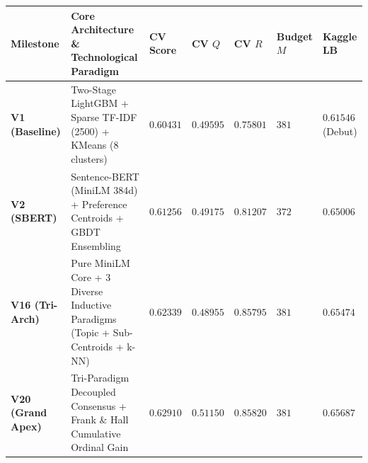 \begin{table}[!htbp]

  \centering

  \footnotesize

  \setlength{\tabcolsep}{4pt}

  \begin{tabularx}{\linewidth}{>{\bfseries\raggedright\arraybackslash}p{2.2cm} >{\raggedright\arraybackslash}X >{\centering\arraybackslash}p{1.3cm} >{\centering\arraybackslash}p{1.2cm} >{\centering\arraybackslash}p{1.2cm} >{\centering\arraybackslash}p{1.1cm} >{\centering\arraybackslash}p{1.8cm}}

    \toprule

    \rowcolor{PrismHeader}

    \color{PrismWhite}\textbf{Milestone} & 

    \color{PrismWhite}\textbf{Core Architecture \& Technological Paradigm} & 

    \color{PrismWhite}\textbf{CV Score} & 

    \color{PrismWhite}\textbf{CV $Q$} & 

    \color{PrismWhite}\textbf{CV $R$} & 

    \color{PrismWhite}\textbf{Budget $M$} & 

    \color{PrismWhite}\textbf{Kaggle LB} \\

    \midrule

    \textbf{V1 (Baseline)} & Two-Stage LightGBM + Sparse TF-IDF (2500) + KMeans (8 clusters) & $0.60431$ & $0.49595$ & $0.75801$ & $381$ & $0.61546$ (Debut) \\

    \rowcolor{PrismLabel}

    \textbf{V2 (SBERT)} & Sentence-BERT (MiniLM 384d) + Preference Centroids + GBDT Ensembling & $0.61256$ & $0.49175$ & $0.81207$ & $372$ & $0.65006$ \\

    \textbf{V16 (Tri-Arch)} & Pure MiniLM Core + 3 Diverse Inductive Paradigms (Topic + Sub-Centroids + k-NN) & $0.62339$ & $0.48955$ & $\mathbf{0.85795}$ & $381$ & $0.65474$ \\

    \rowcolor{PrismLabel}

    \textbf{V20 (Grand Apex)} & Tri-Paradigm Decoupled Consensus + Frank \& Hall Cumulative Ordinal Gain & $0.62910$ & $0.51150$ & $0.85820$ & $381$ & $0.65687$ \\


\end{tabularx}
\end{table}
